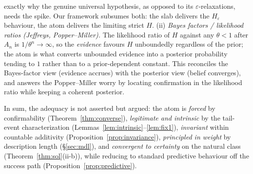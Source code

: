 \documentclass{amsart}
\theoremstyle{definition}
\begin{document}
\begin{enumerate}
exactly why the genuine universal hypothesis, as opposed to its
$\varepsilon$-relaxations, needs the spike. Our framework subsumes both: the slab
delivers the $H_\varepsilon$ behaviour, the atom delivers the limiting strict $H$.
(ii) \emph{Bayes factors / likelihood ratios (Jeffreys, Popper--Miller).} The
likelihood ratio of $H$ against any $\theta<1$ after $A_n$ is $1/\theta^n\to\infty$,
so the \emph{evidence} favours $H$ unboundedly regardless of the prior; the atom is
what converts unbounded evidence into a posterior probability tending to $1$
rather than to a prior-dependent constant. This reconciles the Bayes-factor view
(evidence accrues) with the posterior view (belief converges), and answers the
Popper--Miller worry by locating confirmation in the likelihood ratio while
keeping a coherent posterior.
\end{enumerate}
In sum, the adequacy is not asserted but argued: the atom is \emph{forced} by
confirmability (Theorem~\ref{thm:converse}), \emph{legitimate and intrinsic} by
the tail-event characterization (Lemmas~\ref{lem:intrinsic}--\ref{lem:fix1}),
\emph{invariant} within countable additivity (Proposition~\ref{prop:invariance}),
\emph{principled in weight} by description length (\S\ref{sec:mdl}), and
\emph{convergent to certainty} on the natural class
(Theorem~\ref{thm:sol}(ii-b)), while reducing to standard predictive behaviour off
the success path (Proposition~\ref{prop:predictive}).
\end{document}
